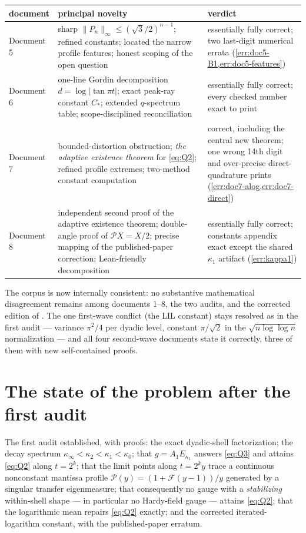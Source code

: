 \documentclass[11pt,oneside]{article}
\theoremstyle{definition}
\theoremstyle{remark}
\begin{document}
\begin{center}
\small
\begin{tabularx}{\textwidth}{@{}l>{\raggedright\arraybackslash}X>{\raggedright\arraybackslash}X@{}}
\toprule
document & principal novelty & verdict \\
\midrule
Document 5 & sharp $\|P_n\|_\infty\le(\sqrt3/2)^{n-1}$; refined
constants; located the narrow profile features; honest scoping of the
open question & essentially fully correct; two last-digit numerical
errata (\cref{err:doc5-B1,err:doc5-features}) \\
\addlinespace
Document 6 & one-line Gordin decomposition $d=\log|\tan\pi t|$; exact
peak-ray constant $C_*$; extended $q$-spectrum table; scope-disciplined
reconciliation & essentially fully correct; every checked number exact
to print \\
\addlinespace
Document 7 & bounded-distortion obstruction; \emph{the adaptive
existence theorem} for \eqref{eq:Q2}; refined profile extremes;
two-method constant computation & correct, including the central new
theorem; one wrong 14th digit and over-precise direct-quadrature prints
(\cref{err:doc7-alog,err:doc7-direct}) \\
\addlinespace
Document 8 & independent second proof of the adaptive existence
theorem; double-angle proof of $\mathcal PX=X/2$; precise mapping of the
published-paper correction; Lean-friendly decomposition & essentially
fully correct; constants appendix exact except the shared $\kappa_1$
artifact (\cref{err:kappa1}) \\
\bottomrule
\end{tabularx}
\end{center}

The corpus is now internally consistent: no substantive mathematical
disagreement remains among documents 1--8, the two audits, and the
corrected edition of \cite{ahl2017}.  The one first-wave conflict (the
LIL constant) stays resolved as in the first audit --- variance
$\pi^2/4$ per dyadic level, constant $\pi/\sqrt2$ in the
$\sqrt{n\log\log n}$ normalization --- and all four second-wave
documents state it correctly, three of them with new self-contained
proofs.

\section{The state of the problem after the first audit}
\label{sec:state}

The first audit \cite{audit} established, with proofs: the exact
dyadic-shell factorization; the decay spectrum
$\kappa_\infty<\kappa_2<\kappa_1<\kappa_0$; that $g=A_1E_{\kappa_1}$
answers \eqref{eq:Q3} and attains \eqref{eq:Q2} along $t=2^k$; that the
limit points along $t=2^ky$ trace a continuous nonconstant mantissa
profile $\mathscr P(y)=(1+\mathscr F(y-1))/y$ generated by a singular
transfer eigenmeasure; that consequently no gauge with a
\emph{stabilizing} within-shell shape --- in particular no Hardy-field
gauge --- attains \eqref{eq:Q2}; that the logarithmic mean repairs
\eqref{eq:Q2} exactly; and the corrected iterated-logarithm constant,
with the published-paper erratum.
\end{document}
